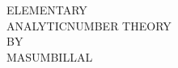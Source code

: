 \documentclass[12pt,leqno,]{book}
\newcommand{\wb}[2]{\fontsize{#1}{#2}\usefont{U}{webo}{xl}{n}}
\theoremstyle{definition}
\theoremstyle{definition}
\begin{document}
	\begin{titlepage}
		\centering
		\vspace*{2\baselineskip}
		{\ifxetex\fontsize{30}{10}\titlefont\fi E\hspace{.1em}L\hspace{.1em}E\hspace{.1em}M\hspace{.1em}E\hspace{.1em}N\hspace{.1em}T\hspace{.1em}A\hspace{.1em}R\hspace{.1em}Y\\\vspace{.3in} ANALYTIC\hspace{.3em}NUMBER\hspace{.3em} THEORY}\\[2\baselineskip]
		\ifxetex
		\fi
		{BY}\\[\baselineskip]
		{\ifxetex\fontsize{20}{10}\hspace{.5em}\titlefont\fi MASUM\hspace{.5em}BILLAL}\\[\baselineskip]
		\ifxetex
		\fi
		\vfill
		\ifxetex
		\fi
		\vfill
	\end{titlepage}
\end{document}
